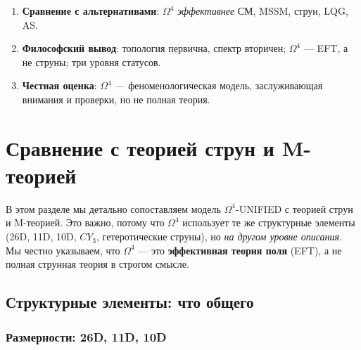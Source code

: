 \documentclass[11pt,a4paper]{article}
\newcommand{\CY}{\ensuremath{CY_3}}
\newcommand{\Om}{\ensuremath{\Omega^4}}
\theoremstyle{definition}
\begin{document}
\begin{enumerate}
\begin{itemize}
              \item Ядерная физика: формулы подобраны,
                    не выведены из первых принципов (открыто).
          \end{itemize}
    \item \textbf{Сравнение с альтернативами}:
          $\Om$ \emph{эффективнее} СМ, MSSM, струн, LQG, AS.
    \item \textbf{Философский вывод}: топология первична,
          спектр вторичен; $\Om$ --- EFT, а не струны;
          три уровня статусов.
    \item \textbf{Честная оценка}: $\Om$ --- феноменологическая
          модель, заслуживающая внимания и проверки, но
          не полная теория.
\end{enumerate}
\section{Сравнение с теорией струн и M-теорией}
\label{sec:string-comparison}

В этом разделе мы детально сопоставляем модель $\Om$-UNIFIED
с теорией струн и M-теорией. Это важно, потому что $\Om$
использует те же структурные элементы (26D, 11D, 10D, $\CY$,
гетеротические струны), но \emph{на другом уровне описания}.
Мы честно указываем, что $\Om$ --- это \textbf{эффективная
теория поля} (EFT), а не полная струнная теория в строгом смысле.

\subsection{Структурные элементы: что общего}
\label{subsec:string-common}

\subsubsection{Размерности: 26D, 11D, 10D}
\end{document}
